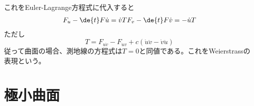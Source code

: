         これをEuler-Lagrange方程式に代入すると
        \begin{align*}
            F_{u} - \de{t}F{\dot{u}} = \dot{v}T
            F_{v} - \de{t}F{\dot{v}} = -\dot{u}T
        \end{align*}
        ただし
            \[T = F_{u\dot{v}} - F_{\dot{u}v} + c(\dot{u}\ddot{v} - \dot{v}\ddot{u})\]
        従って曲面の場合、測地線の方程式は$T = 0$と同値である。これをWeierstrassの表現という。
            
\section{極小曲面}